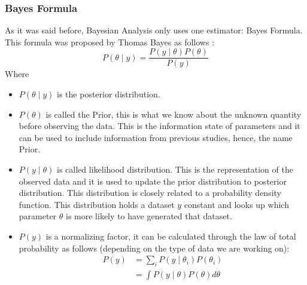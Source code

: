     \subsubsection{Bayes Formula}
    	As it was said before, Bayesian Analysis only uses one estimator: Bayes Formula. This formula was proposed by Thomas Bayes as follows \cite{youtube1}:
        \begin{equation}
        	P(\theta\mid y)=\frac{P(y\mid\theta)P(\theta)}{P(y)}
        \end{equation}
        Where
        \begin{itemize}
        	\item $P(\theta\mid y)$ is the posterior distribution.
            \item $P(\theta)$ is called the Prior, this is what we know about the unknown quantity before observing the data. This is the information state of parameters and it can be used to include information from previous studies, hence, the name Prior.
            \item $P(y\mid\theta)$ is called likelihood distribution. This is the representation of the observed data and it is used to update the prior distribution to posterior distribution. This distribution is closely related to a probability density function. This distribution holds a dataset $y$ constant and looks up which parameter $\theta$ is more likely to have generated that dataset.
            \item $P(y)$ is a normalizing factor, it can be calculated through the law of total probability as follows (depending on the type of data we are working on):
			\begin{equation}
				\begin{split}
               P(y)&=\sum_iP(y\mid\theta_i) P(\theta_i)\\
                    	&=\int P(y\mid\theta)P(\theta)d\theta
				\end{split}
			\end{equation}
        \end{itemize}

